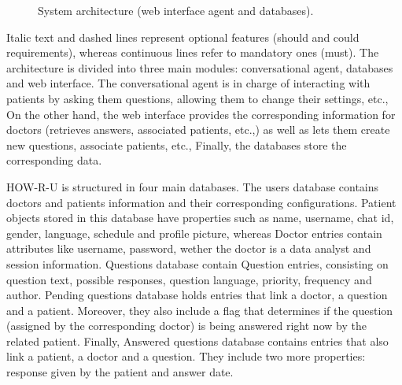 \documentclass[12pt,english]{article}
\begin{document}
\begin{figure}[H]
    \caption{System architecture (web interface agent and databases).}
\end{figure}


Italic text and dashed lines represent optional features (should and could requirements), whereas continuous  lines refer to mandatory ones (must). The architecture is divided into three main modules: conversational agent, databases and web interface. The conversational agent is in charge of interacting with patients by asking them questions, allowing them to change their settings, etc., On the other hand, the web interface provides the corresponding information for doctors (retrieves answers, associated patients, etc.,) as well as lets them create new questions, associate patients, etc., Finally, the databases store the corresponding data.

HOW-R-U is structured in four main databases. The users database contains doctors and patients information and their corresponding configurations. Patient objects stored in this database have properties such as name, username, chat id, gender, language, schedule and profile picture, whereas Doctor entries contain attributes like username, password, wether the doctor is a data analyst and session information. Questions database contain Question entries, consisting on question text, possible responses, question language, priority, frequency and author. Pending questions database holds entries that link a doctor, a question and a patient. Moreover, they also include a flag that determines if the question (assigned by the corresponding doctor) is being answered right now by the related patient. Finally, Answered questions database contains entries that also link a patient, a doctor and a question. They include two more properties: response given by the patient and answer date.
\end{document}
